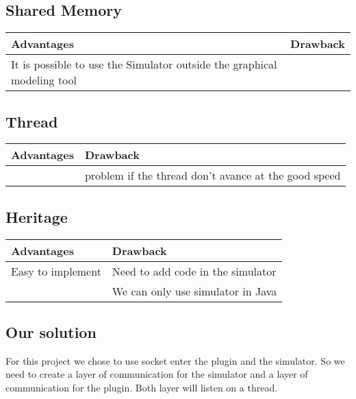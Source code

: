 \subsection{Shared Memory}

\begin{tabular}{|p{}||p{}|}
\hline
  \textbf{Advantages}&\textbf{Drawback}\\
\hline
It is possible to use the Simulator outside the graphical modeling tool & \\
\hline
\end{tabular}


\subsection{Thread}

\begin{tabular}{|p{}||p{}|}
\hline
  \textbf{Advantages}&\textbf{Drawback}\\
\hline
&problem if the thread don't avance at the good speed\\
\hline
\end{tabular}

\subsection{Heritage}

\begin{tabular}{|p{}||p{}|}
\hline
  \textbf{Advantages}&\textbf{Drawback}\\
\hline
Easy to implement&Need to add code in the simulator\\
\hline
&We can only use simulator in Java\\
\hline
\end{tabular}



\subsection{Our solution}

For this project we chose to use socket enter the plugin and the simulator. So we need to create a layer of communication for the simulator and a layer of communication for the plugin. Both layer will listen on a thread.


